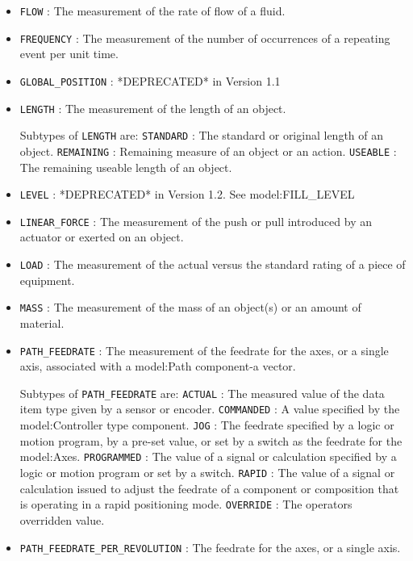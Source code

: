 \begin{itemize}
\item \texttt{FLOW} : The measurement of the rate of flow of a fluid. 

\item \texttt{FREQUENCY} : The measurement of the number of occurrences of a repeating event per unit time. 

\item \texttt{GLOBAL_POSITION} : *DEPRECATED* in Version 1.1 

\item \texttt{LENGTH} : The measurement of the length of an object. 

Subtypes of \texttt{LENGTH} are: 
\newline\tab \texttt{STANDARD} : The standard or original length of an object. 
\newline\tab \texttt{REMAINING} : Remaining measure of an object or an action. 
\newline\tab \texttt{USEABLE} : The remaining useable length of an object. 
\item \texttt{LEVEL} : *DEPRECATED* in Version 1.2.  See {model:FILL_LEVEL} 

\item \texttt{LINEAR_FORCE} : The measurement of the push or pull introduced by an actuator or exerted on an object. 

\item \texttt{LOAD} : The measurement of the actual versus the standard rating of a piece of equipment. 

\item \texttt{MASS} : The measurement of the mass of an object(s) or an amount of material. 

\item \texttt{PATH_FEEDRATE} : The measurement of the feedrate for the axes, or a single axis, associated with a {model:Path} component-a vector. 

Subtypes of \texttt{PATH_FEEDRATE} are: 
\newline\tab \texttt{ACTUAL} : The measured value of the data item type given by a sensor or encoder. 
\newline\tab \texttt{COMMANDED} : A value specified by the {model:Controller} type component. 
\newline\tab \texttt{JOG} : The feedrate specified by a logic or motion program, by a pre-set value, or set by a switch as the feedrate for the {model:Axes}.  
\newline\tab \texttt{PROGRAMMED} : The value of a signal or calculation specified by a logic or motion program or set by a switch. 
\newline\tab \texttt{RAPID} : The value of a signal or calculation issued to adjust the feedrate of a component or composition that is operating in a rapid positioning mode. 
\newline\tab \texttt{OVERRIDE} : The operators overridden value. 
\item \texttt{PATH_FEEDRATE_PER_REVOLUTION} : The feedrate for the axes, or a single axis. 


\end{itemize}
